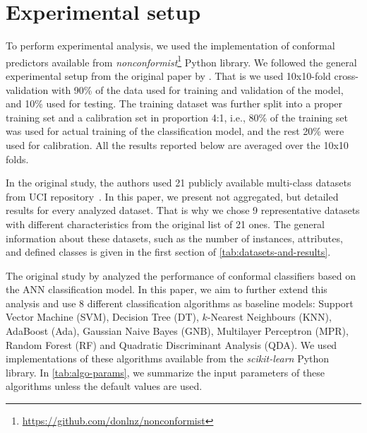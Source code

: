 \section{Experimental setup}
\label{sec:setup}


To perform experimental analysis, we used the implementation of conformal
predictors available from
\textit{nonconformist}\footnote{\url{https://github.com/donlnz/nonconformist}} Python library. 
We followed the general experimental setup from the original paper by \citet{johansson2017model}.
That is we used 10x10-fold cross-validation with 90\% of the data used for 
training and validation of the model, and 10\% used for testing.
The training dataset was further split into a proper training set and a 
calibration set in proportion 4:1, i.e., 80\% of the training set was used for
actual training of the classification model, and the rest 20\% were used 
for calibration.
All the results reported below are averaged over the 10x10 folds.

In the original study, the authors used
21 publicly available multi-class datasets from UCI repository~\cite{Dua:2019}.
In this paper, we present not aggregated, but detailed results for every analyzed
dataset. That is why we chose 9 representative datasets with different
characteristics from the original list of 21 ones. 
The general information about these datasets, such as the number of instances, attributes, and defined classes is given in the first section of \cref{tab:datasets-and-results}.



The original study by \citet{johansson2017model} analyzed the performance of 
conformal classifiers based on the ANN classification model.
In this paper, we aim to further extend this analysis and use 8 different
classification algorithms as baseline models: Support Vector Machine (SVM), Decision Tree (DT), $k$-Nearest Neighbours (KNN), AdaBoost (Ada), Gaussian Naive Bayes (GNB), Multilayer Perceptron (MPR), Random Forest (RF) and Quadratic Discriminant Analysis (QDA). We used implementations of these algorithms
available from the  \textit{scikit-learn} Python library. In \cref{tab:algo-params},
we summarize the input parameters of these algorithms unless the default values 
are used.

